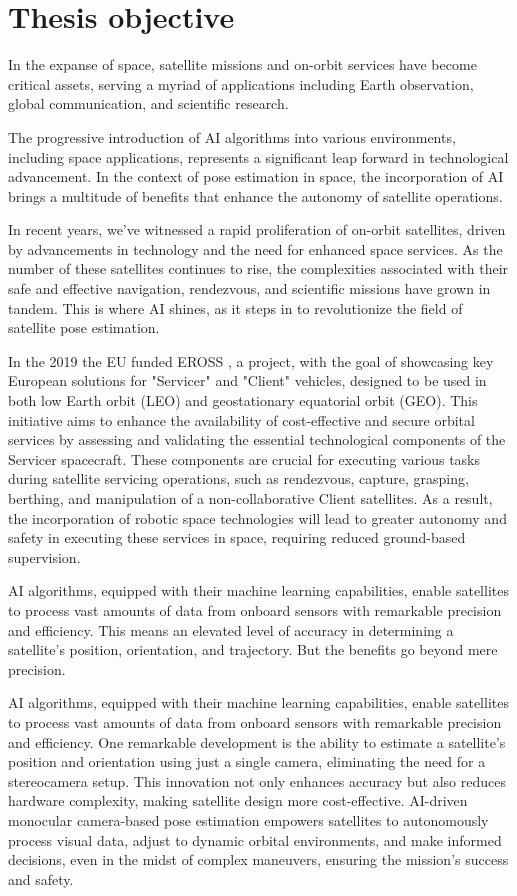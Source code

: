 \section{Thesis objective}

In the expanse of space, satellite missions and on-orbit services have become critical assets, serving a myriad of applications including Earth observation, global communication, and scientific research.

The progressive introduction of AI algorithms into various environments, including space applications, represents a significant leap forward in technological advancement. In the context of pose estimation in space, the incorporation of AI brings a multitude of benefits that enhance the  autonomy of satellite operations.

In recent years, we've witnessed a rapid proliferation of on-orbit satellites, driven by advancements in technology and the need for enhanced space services. As the number of these satellites continues to rise, the complexities associated with their safe and effective navigation, rendezvous, and scientific missions have grown in tandem. This is where AI shines, as it steps in to revolutionize the field of satellite pose estimation.

In the 2019 the EU funded EROSS \cite{CORDIS_2018}, a project, with the goal of showcasing key European solutions for "Servicer" and "Client" vehicles, designed to be used in both low Earth orbit (LEO) and geostationary equatorial orbit (GEO). This initiative aims to enhance the availability of cost-effective and secure orbital services by assessing and validating the essential technological components of the Servicer spacecraft. These components are crucial for executing various tasks during satellite servicing operations, such as rendezvous, capture, grasping, berthing, and manipulation of a non-collaborative Client satellites. As a result, the incorporation of robotic space technologies will lead to greater autonomy and safety in executing these services in space, requiring reduced ground-based supervision.

AI algorithms, equipped with their machine learning capabilities, enable satellites to process vast amounts of data from onboard sensors with remarkable precision and efficiency. This means an elevated level of accuracy in determining a satellite's position, orientation, and trajectory. But the benefits go beyond mere precision.

AI algorithms, equipped with their machine learning capabilities, enable satellites to process vast amounts of data from onboard sensors with remarkable precision and efficiency. One remarkable development is the ability to estimate a satellite's position and orientation using just a single camera, eliminating the need for a stereocamera setup. This innovation not only enhances accuracy but also reduces hardware complexity, making satellite design more cost-effective. AI-driven monocular camera-based pose estimation empowers satellites to autonomously process visual data, adjust to dynamic orbital environments, and make informed decisions, even in the midst of complex maneuvers, ensuring the mission's success and safety.

